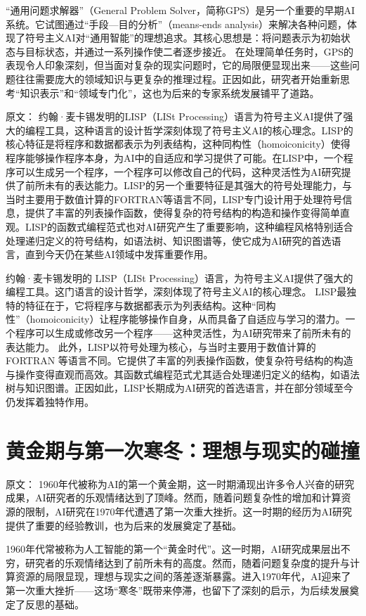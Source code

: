 “通用问题求解器”（General Problem Solver，简称GPS）是另一个重要的早期AI系统。它试图通过“手段—目的分析”（means-ends analysis）来解决各种问题，体现了符号主义AI对“通用智能”的理想追求。其核心思想是：将问题表示为初始状态与目标状态，并通过一系列操作使二者逐步接近。  
在处理简单任务时，GPS的表现令人印象深刻，但当面对复杂的现实问题时，它的局限便显现出来——这些问题往往需要庞大的领域知识与更复杂的推理过程。正因如此，研究者开始重新思考“知识表示”和“领域专门化”，这也为后来的专家系统发展铺平了道路。

原文：
约翰·麦卡锡发明的LISP（LISt Processing）语言为符号主义AI提供了强大的编程工具，这种语言的设计哲学深刻体现了符号主义AI的核心理念。LISP的核心特征是将程序和数据都表示为列表结构，这种同构性（homoiconicity）使得程序能够操作程序本身，为AI中的自适应和学习提供了可能。在LISP中，一个程序可以生成另一个程序，一个程序可以修改自己的代码，这种灵活性为AI研究提供了前所未有的表达能力。LISP的另一个重要特征是其强大的符号处理能力，与当时主要用于数值计算的FORTRAN等语言不同，LISP专门设计用于处理符号信息，提供了丰富的列表操作函数，使得复杂的符号结构的构造和操作变得简单直观。LISP的函数式编程范式也对AI研究产生了重要影响，这种编程风格特别适合处理递归定义的符号结构，如语法树、知识图谱等，使它成为AI研究的首选语言，直到今天仍在某些AI领域中发挥重要作用。

约翰·麦卡锡发明的 LISP（LISt Processing）语言，为符号主义AI提供了强大的编程工具。这门语言的设计哲学，深刻体现了符号主义AI的核心理念。  
LISP最独特的特征在于，它将程序与数据都表示为列表结构。这种“同构性”（homoiconicity）让程序能够操作自身，从而具备了自适应与学习的潜力。一个程序可以生成或修改另一个程序——这种灵活性，为AI研究带来了前所未有的表达能力。  
此外，LISP以符号处理为核心，与当时主要用于数值计算的 FORTRAN 等语言不同。它提供了丰富的列表操作函数，使复杂符号结构的构造与操作变得直观而高效。其函数式编程范式尤其适合处理递归定义的结构，如语法树与知识图谱。正因如此，LISP长期成为AI研究的首选语言，并在部分领域至今仍发挥着独特作用。

\section{黄金期与第一次寒冬：理想与现实的碰撞}

原文：
1960年代被称为AI的第一个黄金期，这一时期涌现出许多令人兴奋的研究成果，AI研究者的乐观情绪达到了顶峰。然而，随着问题复杂性的增加和计算资源的限制，AI研究在1970年代遭遇了第一次重大挫折。这一时期的经历为AI研究提供了重要的经验教训，也为后来的发展奠定了基础。

1960年代常被称为人工智能的第一个“黄金时代”。这一时期，AI研究成果层出不穷，研究者的乐观情绪达到了前所未有的高度。然而，随着问题复杂度的提升与计算资源的局限显现，理想与现实之间的落差逐渐暴露。进入1970年代，AI迎来了第一次重大挫折——这场“寒冬”既带来停滞，也留下了深刻的启示，为后续发展奠定了反思的基础。

